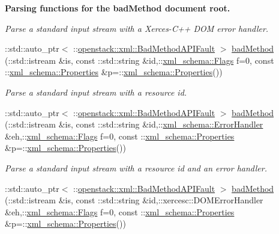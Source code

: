 \begin{Indent}{\bf Parsing functions for the badMethod document root.}
\begin{DoxyCompactItemize}
\begin{DoxyCompactList}\small\item\em Parse a standard input stream with a Xerces-\/C++ DOM error handler. \item\end{DoxyCompactList}\item 
::std::auto\_\-ptr$<$ ::\hyperlink{classopenstack_1_1xml_1_1BadMethodAPIFault}{openstack::xml::BadMethodAPIFault} $>$ \hyperlink{namespaceopenstack_1_1xml_a47cb05cbc452a72629fe59e49642e42b}{badMethod} (::std::istream \&is, const ::std::string \&id,::\hyperlink{namespacexml__schema_affb4c227cbd9aa7453dd1dc5a1401943}{xml\_\-schema::Flags} f=0, const ::\hyperlink{namespacexml__schema_ad27ce19a7ee1d3b1064092648898f64c}{xml\_\-schema::Properties} \&p=::\hyperlink{namespacexml__schema_ad27ce19a7ee1d3b1064092648898f64c}{xml\_\-schema::Properties}())
\begin{DoxyCompactList}\small\item\em Parse a standard input stream with a resource id. \item\end{DoxyCompactList}\item 
::std::auto\_\-ptr$<$ ::\hyperlink{classopenstack_1_1xml_1_1BadMethodAPIFault}{openstack::xml::BadMethodAPIFault} $>$ \hyperlink{namespaceopenstack_1_1xml_a35222dcb3dbe2669d8b60e895e8532ca}{badMethod} (::std::istream \&is, const ::std::string \&id,::\hyperlink{namespacexml__schema_ab1c9361bfd3b404eaabf0c31eded79dc}{xml\_\-schema::ErrorHandler} \&eh,::\hyperlink{namespacexml__schema_affb4c227cbd9aa7453dd1dc5a1401943}{xml\_\-schema::Flags} f=0, const ::\hyperlink{namespacexml__schema_ad27ce19a7ee1d3b1064092648898f64c}{xml\_\-schema::Properties} \&p=::\hyperlink{namespacexml__schema_ad27ce19a7ee1d3b1064092648898f64c}{xml\_\-schema::Properties}())
\begin{DoxyCompactList}\small\item\em Parse a standard input stream with a resource id and an error handler. \item\end{DoxyCompactList}\item 
::std::auto\_\-ptr$<$ ::\hyperlink{classopenstack_1_1xml_1_1BadMethodAPIFault}{openstack::xml::BadMethodAPIFault} $>$ \hyperlink{namespaceopenstack_1_1xml_a13d3d86bcc239f31b22964389fb31c8b}{badMethod} (::std::istream \&is, const ::std::string \&id,::xercesc::DOMErrorHandler \&eh,::\hyperlink{namespacexml__schema_affb4c227cbd9aa7453dd1dc5a1401943}{xml\_\-schema::Flags} f=0, const ::\hyperlink{namespacexml__schema_ad27ce19a7ee1d3b1064092648898f64c}{xml\_\-schema::Properties} \&p=::\hyperlink{namespacexml__schema_ad27ce19a7ee1d3b1064092648898f64c}{xml\_\-schema::Properties}())

\end{DoxyCompactItemize}
\end{Indent}
